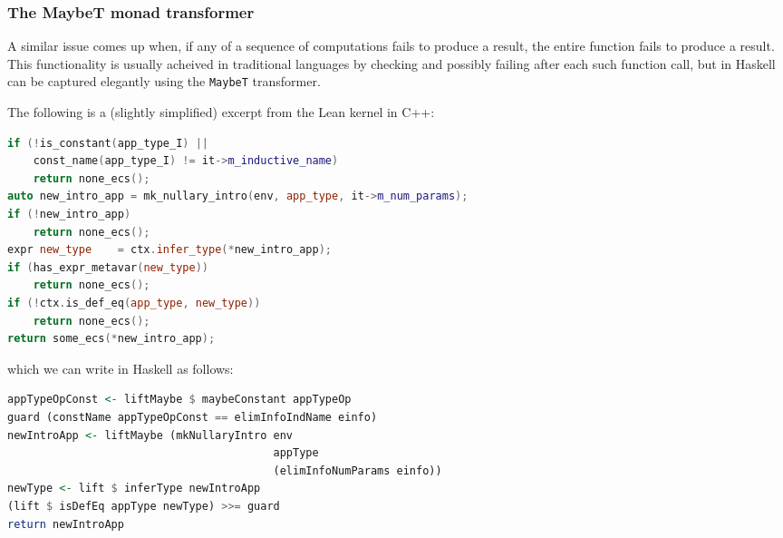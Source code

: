 \documentclass{article}
\begin{document}
\begin{spacing}{1.1}
\subsubsection{The MaybeT monad transformer}

A similar issue comes up when, if any of a sequence of computations fails to produce a result, the entire function fails to produce a result. This functionality is usually acheived in traditional languages by checking and possibly failing after each such function call, but in Haskell can be captured elegantly using the \lstinline{MaybeT} transformer.

The following is a (slightly simplified) excerpt from the Lean kernel in C++:
\begin{lstlisting}[language=C++]
if (!is_constant(app_type_I) ||
    const_name(app_type_I) != it->m_inductive_name)
    return none_ecs();
auto new_intro_app = mk_nullary_intro(env, app_type, it->m_num_params);
if (!new_intro_app)
    return none_ecs();
expr new_type    = ctx.infer_type(*new_intro_app);
if (has_expr_metavar(new_type))
    return none_ecs();
if (!ctx.is_def_eq(app_type, new_type))
    return none_ecs();
return some_ecs(*new_intro_app);
\end{lstlisting}

which we can write in Haskell as follows:

\begin{lstlisting}[language=Haskell]
appTypeOpConst <- liftMaybe $ maybeConstant appTypeOp
guard (constName appTypeOpConst == elimInfoIndName einfo)
newIntroApp <- liftMaybe (mkNullaryIntro env
                                         appType
                                         (elimInfoNumParams einfo))
newType <- lift $ inferType newIntroApp
(lift $ isDefEq appType newType) >>= guard
return newIntroApp
\end{lstlisting}

\end{spacing}



\end{document}

